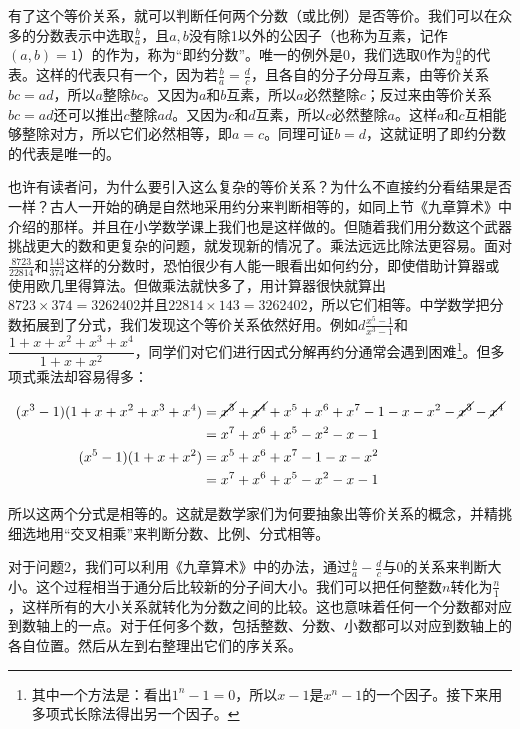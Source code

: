 \documentclass[b5paper]{ctexart}
\begin{document}
有了这个等价关系，就可以判断任何两个分数（或比例）是否等价。我们可以在众多的分数表示中选取$\frac{b}{a}$，且$a, b$没有除1以外的公因子（也称为互素，记作$(a, b) = 1$）的作为，称为“即约分数”。唯一的例外是0，我们选取0作为$\frac{0}{a}$的代表。这样的代表只有一个，因为若$\frac{b}{a} = \frac{d}{c}$，且各自的分子分母互素，由等价关系$bc = ad$，所以$a$整除$bc$。又因为$a$和$b$互素，所以$a$必然整除$c$；反过来由等价关系$bc = ad$还可以推出$c$整除$ad$。又因为$c$和$d$互素，所以$c$必然整除$a$。这样$a$和$c$互相能够整除对方，所以它们必然相等，即$a = c$。同理可证$b = d$，这就证明了即约分数的代表是唯一的。

也许有读者问，为什么要引入这么复杂的等价关系？为什么不直接约分看结果是否一样？古人一开始的确是自然地采用约分来判断相等的，如同上节《九章算术》中介绍的那样。并且在小学数学课上我们也是这样做的。但随着我们用分数这个武器挑战更大的数和更复杂的问题，就发现新的情况了。乘法远远比除法更容易。面对$\frac{8723}{22814}$和$\frac{143}{374}$这样的分数时，恐怕很少有人能一眼看出如何约分，即使借助计算器或使用欧几里得算法。但做乘法就快多了，用计算器很快就算出$8723 \times 374 = 3262402$并且$22814 \times 143 = 3262402$，所以它们相等。中学数学把分数拓展到了分式，我们发现这个等价关系依然好用。例如$d\frac{x^5 - 1}{x^3 - 1}$和$\dfrac{1 + x + x^2 + x^3 + x^4}{1 + x + x^2}$，同学们对它们进行因式分解再约分通常会遇到困难\footnote{其中一个方法是：看出$1^n - 1 = 0$，所以$x-1$是$x^n-1$的一个因子。接下来用多项式长除法得出另一个因子。}。但多项式乘法却容易得多：

\begin{align*}
(x^3 - 1)(1 + x + x^2 + x^3 + x^4) &= \cancel{x^3} + \cancel{x^4} + x^5 + x^6 + x^7 - 1 - x - x^2 - \cancel{x^3} - \cancel{x^4} \\
  &= x^7 + x^6 + x^5 - x^2 - x - 1 \\
(x^5 - 1)(1 + x + x^2) &= x^5 + x^6 + x^7 - 1 - x - x^2 \\
  &= x^7 + x^6 + x^5 - x^2 - x - 1
\end{align*}

所以这两个分式是相等的。这就是数学家们为何要抽象出等价关系的概念，并精挑细选地用“交叉相乘”来判断分数、比例、分式相等。

\vspace{3mm}
对于问题2，我们可以利用《九章算术》中的办法，通过$\frac{b}{a} - \frac{d}{c}$与0的关系来判断大小。这个过程相当于通分后比较新的分子间大小。我们可以把任何整数$n$转化为$\frac{n}{1}$，这样所有的大小关系就转化为分数之间的比较。这也意味着任何一个分数都对应到数轴上的一点。对于任何多个数，包括整数、分数、小数都可以对应到数轴上的各自位置。然后从左到右整理出它们的序关系。
\end{document}

